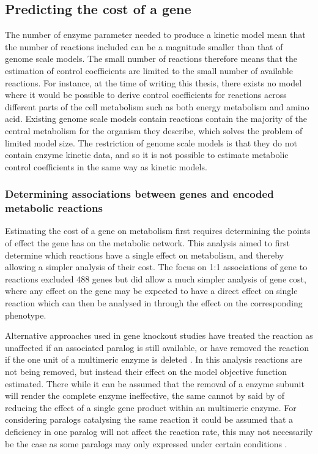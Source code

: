 \subsection{Predicting the cost of a gene}

The number of enzyme parameter needed to produce a kinetic model mean that the number of reactions included can be a magnitude smaller than that of genome scale models. The small number of reactions therefore means that the estimation of control coefficients are limited to the small number of available reactions. For instance, at the time of writing this thesis, there exists no model where it would be possible to derive control coefficients for reactions across different parts of the cell metabolism such as both energy metabolism and amino acid. Existing genome scale models contain reactions contain the majority of the central metabolism for the organism they describe, which solves the problem of limited model size. The restriction of genome scale models is that they do not contain enzyme kinetic data, and so it is not possible to estimate metabolic control coefficients in the same way as kinetic models.

\subsubsection{Determining associations between genes and encoded metabolic reactions}

Estimating the cost of a gene on metabolism first requires determining the points of effect the gene has on the metabolic network. This analysis aimed to first determine which reactions have a single effect on metabolism, and thereby allowing a simpler analysis of their cost. The focus on 1:1 associations of gene to reactions excluded 488 genes but did allow a much simpler analysis of gene cost, where any effect on the gene may be expected to have a direct effect on single reaction which can then be analysed in through the effect on the corresponding phenotype.

Alternative approaches used in gene knockout studies have treated the reaction as unaffected if an associated paralog is still available, or have removed the reaction if the one unit of a multimeric enzyme is deleted \cite{pal2006}. In this analysis reactions are not being removed, but instead their effect on the model objective function estimated. There while it can be assumed that the removal of a enzyme subunit will render the complete enzyme ineffective, the same cannot by said by of reducing the effect of a single gene product within an multimeric enzyme. For considering paralogs catalysing the same reaction it could be assumed that a deficiency in one paralog will not affect the reaction rate, this may not necessarily be the case as some paralogs may only expressed under certain conditions \cite{carlson2007,perez2008}.

